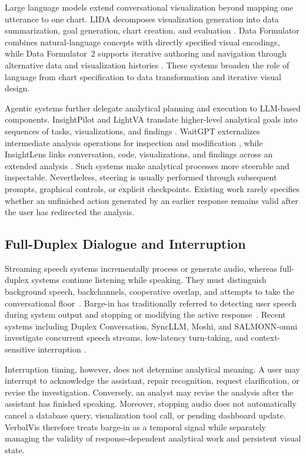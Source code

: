 \documentclass[journal]{IEEEtran}
\begin{document}
Large language models extend conversational visualization beyond mapping one
utterance to one chart. LIDA decomposes visualization generation into data
summarization, goal generation, chart creation, and evaluation
\cite{dibia2023lida}. Data Formulator combines natural-language concepts with
directly specified visual encodings, while Data Formulator~2 supports iterative
authoring and navigation through alternative data and visualization histories
\cite{wang2024dataformulator,wang2024dataformulator2}. These systems broaden
the role of language from chart specification to data transformation and
iterative visual design.

Agentic systems further delegate analytical planning and execution to
LLM-based components. InsightPilot and LightVA translate higher-level
analytical goals into sequences of tasks, visualizations, and findings
\cite{ma2023insightpilot,zhao2024lightva}. WaitGPT externalizes intermediate
analysis operations for inspection and modification
\cite{xie2024waitgpt}, while InsightLens links conversation, code,
visualizations, and findings across an extended analysis
\cite{weng2025insightlens}. Such systems make analytical processes more
steerable and inspectable. Nevertheless, steering is usually performed through
subsequent prompts, graphical controls, or explicit checkpoints. Existing work
rarely specifies whether an unfinished action generated by an earlier response
remains valid after the user has redirected the analysis.

\subsection{Full-Duplex Dialogue and Interruption}
\label{sec:rw-duplex}

Streaming speech systems incrementally process or generate audio, whereas
full-duplex systems continue listening while speaking. They must distinguish
background speech, backchannels, cooperative overlap, and attempts to take the
conversational floor~\cite{skantze2021turntaking}. Barge-in has traditionally
referred to detecting user speech during system output and stopping or
modifying the active response~\cite{heins1997bargein}. Recent systems including
Duplex Conversation, SyncLLM, Moshi, and SALMONN-omni investigate concurrent
speech streams, low-latency turn-taking, and context-sensitive interruption
\cite{lin2022duplex,veluri2024syncllm,
defossez2024moshi,yu2025salmonnomni}.

Interruption timing, however, does not determine analytical meaning. A user may
interrupt to acknowledge the assistant, repair recognition, request
clarification, or revise the investigation. Conversely, an analyst may revise
the analysis after the assistant has finished speaking. Moreover, stopping
audio does not automatically cancel a database query, visualization tool call,
or pending dashboard update. VerbalVis therefore treats barge-in as a temporal
signal while separately managing the validity of response-dependent analytical
work and persistent visual state.
\end{document}
